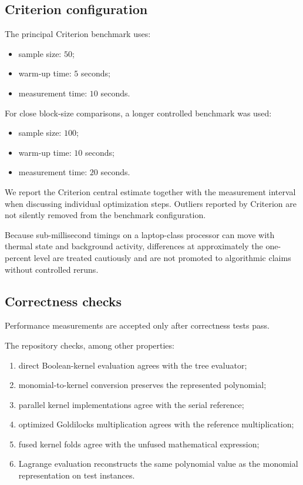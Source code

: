 \subsection{Criterion configuration}

The principal Criterion benchmark uses:

\begin{itemize}
    \item sample size: \(50\);
    \item warm-up time: \(5\) seconds;
    \item measurement time: \(10\) seconds.
\end{itemize}

For close block-size comparisons, a longer controlled benchmark was used:

\begin{itemize}
    \item sample size: \(100\);
    \item warm-up time: \(10\) seconds;
    \item measurement time: \(20\) seconds.
\end{itemize}

We report the Criterion central estimate together with the measurement
interval when discussing individual optimization steps. Outliers reported
by Criterion are not silently removed from the benchmark configuration.

Because sub-millisecond timings on a laptop-class processor can move with
thermal state and background activity, differences at approximately the
one-percent level are treated cautiously and are not promoted to
algorithmic claims without controlled reruns.

\subsection{Correctness checks}

Performance measurements are accepted only after correctness tests pass.

The repository checks, among other properties:

\begin{enumerate}
    \item direct Boolean-kernel evaluation agrees with the tree evaluator;
    \item monomial-to-kernel conversion preserves the represented polynomial;
    \item parallel kernel implementations agree with the serial reference;
    \item optimized Goldilocks multiplication agrees with the reference
    multiplication;
    \item fused kernel folds agree with the unfused mathematical expression;
    \item Lagrange evaluation reconstructs the same polynomial value as the
    monomial representation on test instances.
\end{enumerate}

